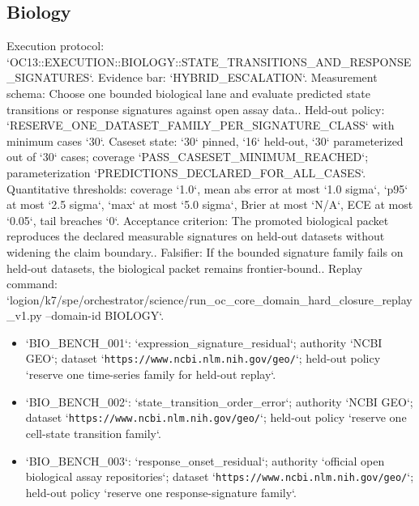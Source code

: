 \subsection{Biology}
Execution protocol: `OC13::EXECUTION::BIOLOGY::STATE\_TRANSITIONS\_AND\_RESPONSE\_SIGNATURES`. Evidence bar: `HYBRID\_ESCALATION`.
Measurement schema: Choose one bounded biological lane and evaluate predicted state transitions or response signatures against open assay data..
Held-out policy: `RESERVE\_ONE\_DATASET\_FAMILY\_PER\_SIGNATURE\_CLASS` with minimum cases `30`.
Caseset state: `30` pinned, `16` held-out, `30` parameterized out of `30` cases; coverage `PASS\_CASESET\_MINIMUM\_REACHED`; parameterization `PREDICTIONS\_DECLARED\_FOR\_ALL\_CASES`.
Quantitative thresholds: coverage `1.0`, mean abs error at most `1.0 sigma`, `p95` at most `2.5 sigma`, `max` at most `5.0 sigma`, Brier at most `N/A`, ECE at most `0.05`, tail breaches `0`.
Acceptance criterion: The promoted biological packet reproduces the declared measurable signatures on held-out datasets without widening the claim boundary..
Falsifier: If the bounded signature family fails on held-out datasets, the biological packet remains frontier-bound..
Replay command: `logion/k7/spe/orchestrator/science/run\_oc\_core\_domain\_hard\_closure\_replay\_v1.py --domain-id BIOLOGY`.
\begin{itemize}
\item `BIO\_BENCH\_001`: `expression\_signature\_residual`; authority `NCBI GEO`; dataset `\texttt{https://www.ncbi.nlm.nih.gov/geo/}`; held-out policy `reserve one time-series family for held-out replay`.
\item `BIO\_BENCH\_002`: `state\_transition\_order\_error`; authority `NCBI GEO`; dataset `\texttt{https://www.ncbi.nlm.nih.gov/geo/}`; held-out policy `reserve one cell-state transition family`.
\item `BIO\_BENCH\_003`: `response\_onset\_residual`; authority `official open biological assay repositories`; dataset `\texttt{https://www.ncbi.nlm.nih.gov/geo/}`; held-out policy `reserve one response-signature family`.
\end{itemize}

